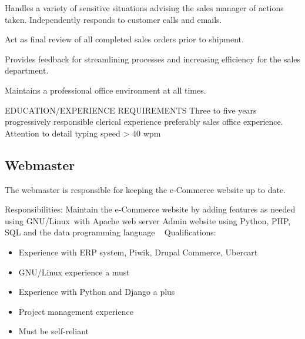Handles a variety of sensitive situations advising the sales manager of actions taken. Independently responds to customer calls and emails.

Act as final review of all completed sales orders prior to shipment.

Provides feedback for streamlining processes and increasing efficiency for the sales department.

Maintains a professional office environment at all times.

EDUCATION/EXPERIENCE REQUIREMENTS
Three to five years progressively responsible clerical experience preferably sales office experience.
Attention to detail
typing speed > 40 wpm

\subsection{Webmaster}
The webmaster is responsible for keeping the e-Commerce website up to date.

Responsibilities:
Maintain the e-Commerce website by adding features as needed using GNU/Linux with Apache web server
Admin website using Python, PHP, SQL and the data programming language
 
Qualifications:
\begin{itemize}
 \item Experience with ERP system, Piwik, Drupal Commerce, Ubercart
 \item GNU/Linux experience a must
 \item Experience with Python and Django a plus
 \item Project management experience
 \item Must be self-reliant
\end{itemize}
 

